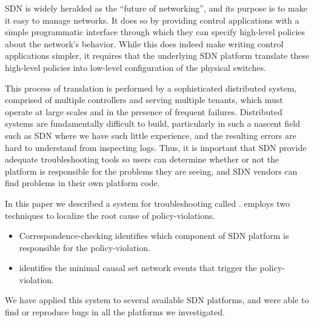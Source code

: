 SDN is widely heralded as the ``future of networking'', and its purpose is to make it easy to manage networks.  It does so by providing control applications with a simple programmatic interface through which they can specify high-level policies about the network's behavior. While this does indeed make writing control applications simpler, it requires that the underlying SDN platform translate these high-level policies into low-level configuration of the physical switches.

This process of translation is performed by a sophisticated distributed system, comprised of multiple controllers and serving multiple tenants, which must operate at large scales and in the presence of frequent failures. Distributed systems are fundamentally difficult to build, particularly in such a nascent field such as SDN where we have such little experience, and the resulting errors are hard to understand from inspecting logs. Thus, it is important that SDN provide adequate troubleshooting tools so users can determine whether or not the platform is responsible for the problems they are seeing, and SDN vendors can find problems in their own platform code.

In this paper we described a system for troubleshooting called \projectname{}. \projectname{} employs two techniques to localize the root cause of policy-violations.\begin{itemize}
    \item Correspondence-checking identifies which component of SDN platform is responsible for the policy-violation.
    \item  \simulator{} identifies the minimal causal set network events that trigger the policy-violation.
\end{itemize}

We have applied this system to several available SDN platforms, and were able to find or reproduce bugs in all the platforms we investigated.
